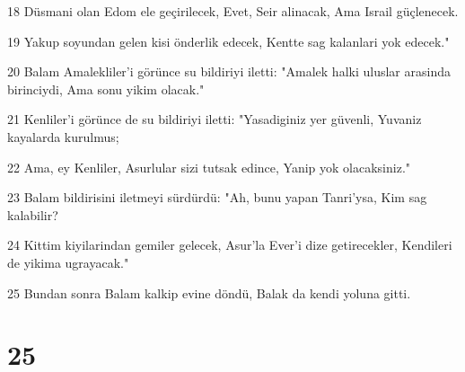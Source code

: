 \par 18 Düsmani olan Edom ele geçirilecek, Evet, Seir alinacak, Ama Israil güçlenecek.
\par 19 Yakup soyundan gelen kisi önderlik edecek, Kentte sag kalanlari yok edecek."
\par 20 Balam Amalekliler'i görünce su bildiriyi iletti: "Amalek halki uluslar arasinda birinciydi, Ama sonu yikim olacak."
\par 21 Kenliler'i görünce de su bildiriyi iletti: "Yasadiginiz yer güvenli, Yuvaniz kayalarda kurulmus;
\par 22 Ama, ey Kenliler, Asurlular sizi tutsak edince, Yanip yok olacaksiniz."
\par 23 Balam bildirisini iletmeyi sürdürdü: "Ah, bunu yapan Tanri'ysa, Kim sag kalabilir?
\par 24 Kittim kiyilarindan gemiler gelecek, Asur'la Ever'i dize getirecekler, Kendileri de yikima ugrayacak."
\par 25 Bundan sonra Balam kalkip evine döndü, Balak da kendi yoluna gitti.

\chapter{25}

